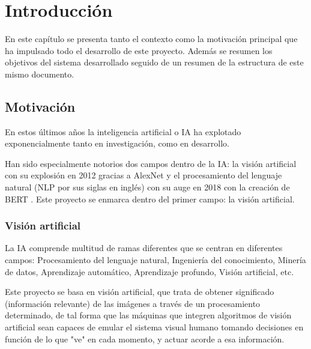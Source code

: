 \chapter{Introducción}

En este capítulo se presenta tanto el contexto como la motivación principal que ha impulsado todo el desarrollo de este proyecto. Además se resumen los objetivos del sistema desarrollado seguido de un resumen de la estructura de este mismo documento.

\section{Motivación}

En estos últimos años la inteligencia artificial o IA ha explotado exponencialmente tanto en investigación, como en desarrollo. 

Han sido especialmente notorios dos campos dentro de la IA: la visión artificial con su explosión en 2012 gracias a AlexNet \cite{alexnet} y el procesamiento del lenguaje natural (NLP por sus siglas en inglés) con su auge en 2018 con la creación de BERT \cite{devlin2018bert}. Este proyecto se enmarca dentro del primer campo: la visión artificial.

\subsection{Visión artificial}

La IA comprende multitud de ramas diferentes que se centran en diferentes campos: Procesamiento del lenguaje natural, Ingeniería del conocimiento, Minería de datos, Aprendizaje automático, Aprendizaje profundo, Visión artificial, etc. 

Este proyecto se basa en visión artificial, que trata de obtener significado (información relevante) de las imágenes a través de un procesamiento determinado, de tal forma que las máquinas que integren algoritmos de visión artificial sean capaces de emular el sistema visual humano tomando decisiones en función de lo que "ve" en cada momento, y actuar acorde a esa información.

